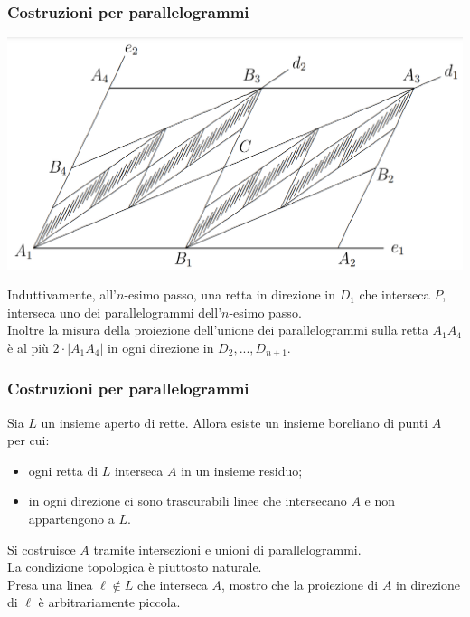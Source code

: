\documentclass[11pt]{beamer} %
\newcommand{\<}{\langle}
\renewcommand{\>}{\rangle}
\theoremstyle{theorem}
\theoremstyle{theorem}
\theoremstyle{theorem}
\theoremstyle{theorem}
\theoremstyle{theorem}
\begin{document}
\begin{frame}[fragile]
	\frametitle{Costruzioni per parallelogrammi}
	
	\begin{center}
	\includegraphics[width=0.5\columnwidth]{passi123.png}
	\end{center}

	Induttivamente, all'$n$-esimo passo, una retta in direzione in $D_1$ che interseca $P$, interseca uno dei parallelogrammi dell'$n$-esimo passo.\\
	Inoltre la misura della proiezione dell'unione dei parallelogrammi 
	sulla retta $A_{1} A_{4}$ è al più $2 \cdot\left|A_{1} A_{4}\right|$ in ogni direzione in $D_2,...,D_{n+1}$.\\

\end{frame}



\begin{frame}
	\frametitle{Costruzioni per parallelogrammi}
	\begin{lemma}[2]
		Sia $L$ un insieme aperto di rette. Allora esiste un insieme boreliano di punti $A$ per cui:\\
		\begin{itemize}
			\item ogni retta di $L$ interseca $A$ in un insieme residuo;\\
			\item in ogni direzione ci sono trascurabili linee che intersecano $A$ e non appartengono a $L$.\\
		\end{itemize}
	\end{lemma}
	
	\pause
	Si costruisce $A$ tramite intersezioni e unioni di parallelogrammi.\\ \pause
	La condizione topologica è piuttosto naturale.\\ \pause
	Presa una linea $\ell \not \in L$ che interseca $A$, mostro che la proiezione di $A$ in direzione di $\ell$ è arbitrariamente piccola.
	
	
\end{frame}	
\end{document}
